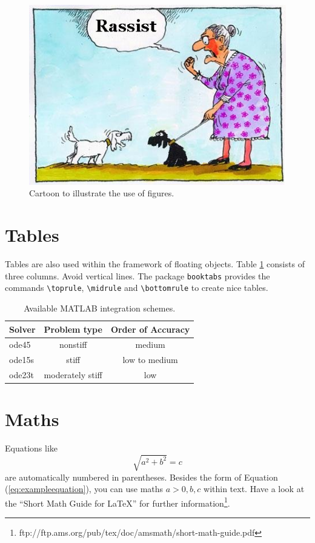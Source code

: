 \begin{figure}
	\centering
	\includegraphics[width=.7\textwidth]{figures/example}
	\caption{Cartoon to illustrate the use of figures.}
	\label{fig:example}
\end{figure}

\section{Tables}

Tables are also used within the framework of floating objects. Table \ref{tab:integrationschemes} consists of three columns. Avoid vertical lines. The package \verb|booktabs| provides the commands \verb|\toprule|, \verb|\midrule| and \verb|\bottomrule| to create nice tables.

\begin{table}
	\centering
	\caption{Available MATLAB integration schemes.}
	\label{tab:integrationschemes}
	\begin{tabular}{lcc}
		\toprule
		Solver & Problem type & Order of Accuracy \\
		\midrule
		ode45 & nonstiff & medium \\
		ode15s & stiff & low to medium \\
		ode23t & moderately stiff & low \\
		\bottomrule
	\end{tabular}
\end{table}

\section{Maths}

Equations like
\begin{equation}
	\label{eq:exampleequation}
	\sqrt{a^2 + b^2} = c
\end{equation}
are automatically numbered in parentheses. Besides the form of Equation (\ref{eq:exampleequation}), you can use maths $a > 0, b, c$ within text. Have a look at the ``Short Math Guide for \LaTeX'' for further information\footnote{ftp://ftp.ams.org/pub/tex/doc/amsmath/short-math-guide.pdf}.

